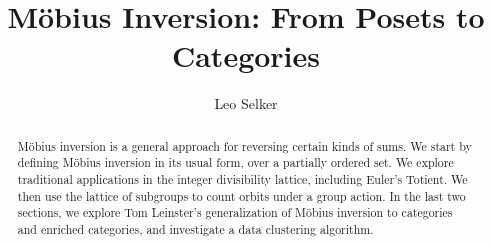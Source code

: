 \documentclass[12pt]{pom_thesis}
\author{Leo Selker}
\title{M\"obius Inversion: From Posets to Categories}
\begin{document}
\maketitle

\begin{abstract} M\"obius inversion is a general approach for reversing certain kinds of sums. We start by defining M\"obius inversion in its usual form, over a partially ordered set. We explore traditional applications in the integer divisibility lattice, including Euler's Totient. We then use the lattice of subgroups to count orbits under a group action. In the last two sections, we explore Tom Leinster's generalization of M\"obius inversion to categories and enriched categories, and investigate a data clustering algorithm.
\end{abstract}

\tableofcontents
\end{document}
